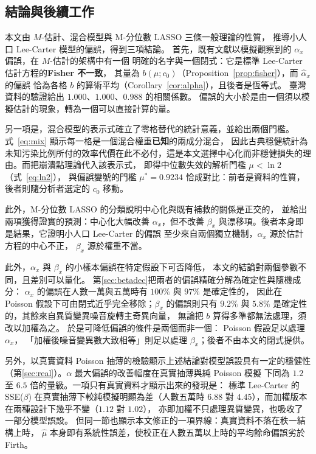 \documentclass[UTF8, fontset=macnew, a4paper, 12pt]{ctexart}
\begin{document}
\subsection{結論與後續工作}\label{subsec:concl}\label{subsec:future}

本文由 $M$-估計、混合模型與 M-分位數 LASSO 三條一般理論的性質，
推導小人口 Lee-Carter 模型的偏誤，得到三項結論。
首先，既有文獻以模擬觀察到的 $\alpha_x$ 偏誤，在 $M$-估計的架構中有一個
明確的名字與一個閉式：它是標準 Lee-Carter 估計方程的\textbf{Fisher 不一致}，
其量為 $b(\mu;c_0)$（Proposition~\ref{prop:fisher}），而 $\hat\alpha_x$ 的偏誤
恰為各格 $b$ 的算術平均（Corollary~\ref{cor:alpha}），且後者是恆等式。
臺灣資料的驗證給出 $1.000$、$1.000$、$0.988$ 的相關係數。
偏誤的大小於是由一個須以模擬估計的現象，轉為一個可以直接計算的量。

另一項是，混合模型的表示式確立了零格替代的統計意義，並給出兩個門檻。
式~\eqref{eq:mix} 顯示每一格是一個混合權重\textbf{已知}的兩成分混合，
因此古典穩健統計為未知污染比例所付的效率代價在此不必付，這是本文選擇中心化而非穩健損失的理由。而把崩潰點理論代入該表示式，
即得中位數失效的解析門檻 $\mu<\ln2$（式~\eqref{eq:ln2}），
與偏誤變號的門檻 $\mu^\ast=0.9234$ 恰成對比：前者是資料的性質，
後者則隨分析者選定的 $c_0$ 移動。

此外，M-分位數 LASSO 的分類說明中心化與既有補救的關係是正交的，
並給出兩項獲得證實的預測：中心化大幅改善 $\alpha_x$，但不改善
$\beta_x$ 與漂移項。後者本身即是結果，它證明小人口 Lee-Carter 的偏誤
至少來自兩個獨立機制，$\alpha_x$ 源於估計方程的中心不正，
$\beta_x$ 源於權重不當。

此外，$\alpha_x$ 與 $\beta_x$ 的小樣本偏誤在特定假設下可否降低，
本文的結論對兩個參數不同，且差別可以量化。
第\ref{sec:betadec}把兩者的偏誤精確分解為確定性與隨機成分：
$\alpha_x$ 的偏誤在人數一萬與五萬時有 $100\%$ 與 $97\%$ 是確定性的，
因此在 Poisson 假設下可由閉式近乎完全移除；$\beta_x$ 的偏誤則只有
$9.2\%$ 與 $5.8\%$ 是確定性的，其餘來自異質變異噪音旋轉主奇異向量，
無論把 $b$ 算得多準都無法處理，須改以加權為之。
於是可降低偏誤的條件是兩個而非一個： Poisson 假設足以處理 $\alpha_x$，
「加權後噪音變異數大致相等」則足以處理 $\beta_x$；後者不由本文的閉式提供。

另外，以真實資料 Poisson 抽薄的檢驗顯示上述結論對模型誤設具有一定的穩健性
（第\ref{sec:real}）。$\alpha$ 最大偏誤的改善幅度在真實抽薄與純 Poisson 模擬
下同為 $1.2$ 至 $6.5$ 倍的量級。一項只有真實資料才顯示出來的發現是：
標準 Lee-Carter 的 SSE($\beta$) 在真實抽薄下較純模擬明顯為差（人數五萬時 $6.88$
對 $4.45$），而加權版本在兩種設計下幾乎不變（$1.12$ 對 $1.02$），
亦即加權不只處理異質變異，也吸收了一部分模型誤設。
但同一節也顯示本文修正的一項界線：真實資料不落在秩一結構上時，
$\hat\mu$ 本身即有系統性誤差，使校正在人數五萬以上時的平均餘命偏誤劣於
Firth。
\end{document}
